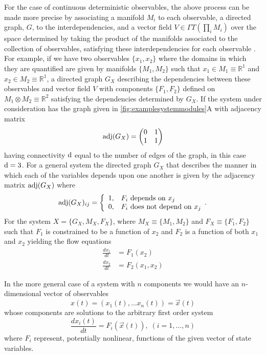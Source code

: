 For the case of continuous deterministic observables, the above process can be made more precise by associating a manifold $M_i$ to each observable, a directed graph, $G$, to the interdependencies, and a vector field $V \in \Gamma T(\prod_i M_i)$ over the space determined by taking the product of the manifolds associated to the collection of observables, satisfying these interdependencies for each observable  \cite{Deville}. For example, if we have two observables $\{x_1,x_2\}$ where the domains in which they are quantified are given by manifolds $\{M_1,M_2\}$ such that $x_1 \in M_1 \equiv \mathbb{R}^1$ and $x_2 \in M_2 \equiv \mathbb{R}^1$, a directed graph $G_X$ describing the dependencies between these observables and vector field $V$ with components $\{F_1,F_2\}$ defined on $M_1 \otimes M_2 \equiv \mathbb{R}^2$ satisfying the dependencies determined by $G_X$. If the system under consideration has the graph given in \ref{fig:examplesystemmodules}A
% 
with adjacency matrix
$$
\mathrm{adj}(G_X) = \begin{pmatrix}
0 & 1 \\
1 & 1
\end{pmatrix}
$$
having connectivity $\mathrm{d}$ equal to the number of edges of the graph, in this case $\mathrm{d} = 3$. For a general system the directed graph $G_X$ that describes the manner in which each of the variables depends upon one another is given by the adjacency matrix $\mathrm{adj}(G_X)$ where
 \begin{displaymath}
   \mathrm{adj}(G_X)_{ij} = \left\{
     \begin{array}{ll}
       1, & F_i \hbox{ depends on } x_j\\
       0, & F_i \hbox{ does not depend on } x_j
     \end{array}.
   \right.
\end{displaymath} For the system $X = \{G_X, M_X, F_X\}$, where $M_X \equiv \{M_1,M_2\}$ and $F_X \equiv \{F_1,F_2\}$ such that $F_1$ is constrained to be a function of $x_2$ and $F_2$ is a function of both $x_1$ and $x_2$ yielding the flow equations
\begin{align*}
\frac{dx_1}{dt} & = F_1(x_2)\\
\frac{dx_2}{dt} & = F_2(x_1,x_2)
\end{align*}

In the more general case of a system with $n$ components we would have an $n$-dimensional vector of observables
$$
x(t) = (x_1(t), \ldots x_n(t)) = \vec{x}(t)
$$
whose components are solutions to the arbitrary first order system
$$
\frac{dx_i(t)}{dt} = F_i(\vec{x}(t)), \; (i=1,\ldots,n)
$$
where $F_i$ represent, potentially nonlinear, functions of the given vector of state variables.

